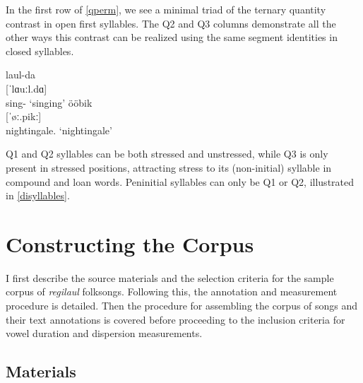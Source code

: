 In the first row of \ref{qperm}, we see a minimal triad of the ternary quantity contrast in open first syllables. The Q2 and Q3 columns demonstrate all the other ways this contrast can be realized using the same segment identities in closed syllables. 

\begin{exe}
\ex \gll laul-da \\
	{[ˈlɑuːl.dɑ]} \\
	sing-\Tr{} 
	\glt	`singing'
\ex 	ööbik \\
	{[ˈøː.pikː]} \\
	nightingale.\Nom{} 
	\glt`nightingale'
\label{disyllables}
\end{exe}
Q1 and Q2 syllables can be both stressed and unstressed, while Q3 is only present in stressed positions, attracting stress to its (non-initial) syllable in compound and loan words. Peninitial syllables can only be Q1 or Q2, illustrated in \ref{disyllables}. 


\section{Constructing the Corpus}

I first describe the source materials and the selection criteria for the sample corpus of {\it regilaul} folksongs. Following this, the annotation and measurement procedure is detailed. Then the procedure for assembling the corpus of songs and their text annotations is covered before proceeding to the inclusion criteria for vowel duration and dispersion measurements.

\subsection{Materials}



%
%




